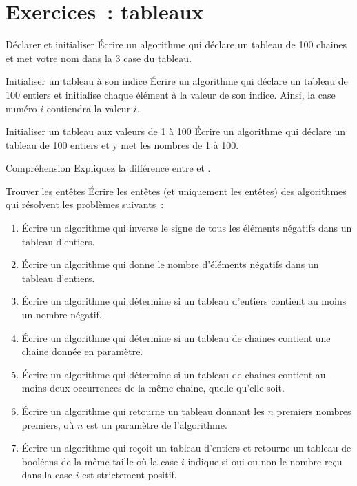 \clearpage
\section{Exercices~: tableaux}


	\begin{Exercice}{Déclarer et initialiser}
		Écrire un algorithme qui déclare un tableau de 100 chaines
		et met votre nom dans la 3\ieme{} case du tableau.
	\end{Exercice}

	\begin{Exercice}{Initialiser un tableau à son indice}
		Écrire un algorithme qui déclare un tableau de 100 entiers
		et initialise chaque élément à la valeur de son indice.
		Ainsi, la case numéro $i$ contiendra la valeur $i$.
	\end{Exercice}

	\begin{Exercice}{Initialiser un tableau aux valeurs de 1 à 100}
		Écrire un algorithme qui déclare un tableau de 100 entiers
		et y met les nombres de 1 à 100.
	\end{Exercice}

	\begin{Exercice}{Compréhension}
		Expliquez la différence entre 
		et .
	\end{Exercice}



	\begin{Exercice}{Trouver les entêtes}
		Écrire les entêtes (et uniquement les entêtes)
		des algorithmes qui résolvent les problèmes suivants~:
		\begin{enumerate}[label=\alph*)]
			\item
				Écrire un algorithme qui 
				inverse le signe de tous les éléments négatifs dans un tableau d’entiers.
			\item
				Écrire un algorithme qui
				donne le nombre d’éléments négatifs dans un tableau d’entiers.
			\item
				Écrire un algorithme qui
				détermine si un tableau d’entiers contient au moins un nombre négatif.
			\item
				Écrire un algorithme qui
				détermine si un tableau de chaines contient
				une chaine donnée en paramètre.
			\item
				Écrire un algorithme qui
				détermine si un tableau de chaines contient
				au moins deux occurrences de la même chaine,
				quelle qu’elle soit.
			\item
				Écrire un algorithme qui 
				retourne un tableau donnant les $n$ premiers nombres premiers,
				où $n$ est un paramètre de l’algorithme.
			\item
				Écrire un algorithme qui 
				reçoit un tableau d’entiers
				et retourne un tableau de booléens de la même taille
				où la case $i$ indique si oui ou non
				le nombre reçu dans la case $i$ est strictement positif.
		\end{enumerate}
	\end{Exercice}


